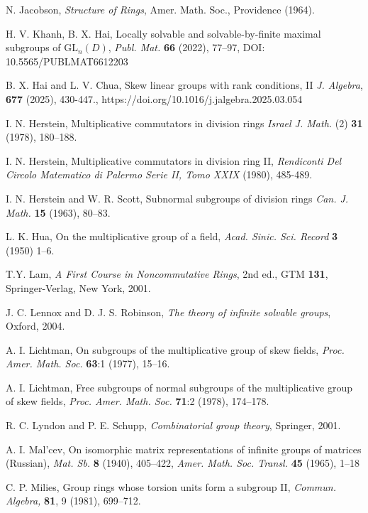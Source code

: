 \documentclass{amsart}
\theoremstyle{definition}
\begin{document}
\begin{thebibliography}{}
 N. Jacobson, \textit{Structure of Rings}, Amer. Math. Soc., Providence (1964).

 H. V. Khanh, B. X. Hai, Locally solvable and solvable-by-finite maximal subgroups of $\mathrm{GL}_n(D)$, \textit{Publ. Mat.} \textbf{66} (2022), 77--97, DOI: 10.5565/PUBLMAT6612203

 B. X. Hai and L. V. Chua, Skew linear groups with rank conditions, II \textit{J. Algebra}, \textbf{677} (2025), 430-447., https://doi.org/10.1016/j.jalgebra.2025.03.054
	
 I. N. Herstein, Multiplicative commutators in division rings \textit{Israel J. Math.} (2) \textbf{31} (1978), 180--188.
	
 I. N. Herstein, Multiplicative commutators in division ring II, \textit{Rendiconti Del Circolo Matematico di Palermo Serie II, Tomo XXIX} (1980), 485-489.
	
 I. N. Herstein and W. R. Scott, Subnormal subgroups of division rings \textit{Can. J. Math.} \textbf{15} (1963), 80--83.
	
 L. K. Hua, On the multiplicative group of a field, \textit{Acad. Sinic. Sci. Record} \textbf{3} (1950) 1--6.
	
 T.Y. Lam, \textit{A First Course in Noncommutative Rings}, 2nd ed., GTM \textbf{131}, Springer-Verlag, New York, 2001.
	
 J. C. Lennox and D. J. S. Robinson, \textit{The theory of infinite solvable groups}, Oxford, 2004.
	
 A. I. Lichtman, On subgroups of the multiplicative group of skew fields, \textit{Proc. Amer. Math. Soc.} \textbf{63}:1 (1977), 15--16.
	
 A. I. Lichtman, Free subgroups of normal subgroups of the multiplicative group of skew fields, \textit{Proc. Amer. Math. Soc.} \textbf{71}:2 (1978), 174--178.		
	
 R. C. Lyndon and P. E. Schupp, \textit{Combinatorial group theory}, Springer, 2001.

 A. I. Mal'cev, On isomorphic matrix representations of infinite groups of matrices (Russian), \textit{Mat. Sb.} \textbf{8} (1940), 405–422, \textit{Amer. Math. Soc. Transl.} \textbf{45} (1965), 1–18
	
 C. P. Milies, Group rings whose torsion units form a subgroup II, \textit{Commun. Algebra,} \textbf{81}, 9 (1981), 699--712.
	

\end{thebibliography}
\end{document}
